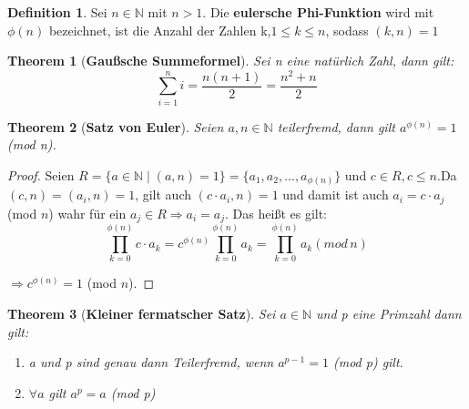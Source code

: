 \documentclass[12pt,oneside]{article}
\newtheorem{theorem}{Theorem}[section]
\theoremstyle{remark}
\theoremstyle{definition}
\newtheorem{definition}{Definition}[section]
\begin{document}
\smallskip

\begin{definition}\label{Df_6}
Sei $n \in \mathbb{N}$ mit $n > 1$. Die \textbf{eulersche Phi-Funktion} wird mit $\phi(n)$ bezeichnet, ist die Anzahl der Zahlen k,$1 \leq k \leq n$, sodass $(k,n) = 1$
\end{definition}

\smallskip

\begin{theorem}[\textbf{Gaußsche Summeformel}]\label{gauss}
Sei n eine natürlich Zahl, dann gilt:
\begin{equation}
    \sum_{i = 1}^{n} i = \frac{n (n + 1)}{2} = \frac{n^2 + n}{2} 
\end{equation}
\end{theorem}

\smallskip
\begin{theorem}[\textbf{Satz von Euler}]\label{Th_1}
Seien $a,n \in \mathbb{N}$ teilerfremd, \newline dann gilt $a^{\phi(n)} = 1 $(mod n).
\end{theorem}

\begin{proof}
    
Seien $R =\{ a \in \mathbb{N} \mid (a,n) = 1 \} =  \{a_{1}, a_{2},...,a_{\phi(n)} \}$ und $c \in R, c \leq n$.\newline\newline Da $(c,n) = (a_{i},n) = 1$, gilt auch $(c \cdot a_{i}, n) = 1$ \newline\newline und damit ist auch $a_{i} = c \cdot a_{j}$(mod $n$) wahr für ein $a_{j} \in R \Rightarrow a_{i} = a_{j}$. Das heißt es gilt:\newline
\begin{equation}
     \prod_{k = 0}^{\phi(n)} c \cdot a_{k} =
     c^{\phi(n)}\prod_{k = 0}^{\phi(n)} a_{k} = \prod_{k = 0}^{\phi(n)}  a_{k} (mod \, n )
\end{equation}
    
     $\Rightarrow c^{\phi(n)} = 1$ (mod $n$).

\end{proof}

\smallskip

\begin{theorem}[\textbf{Kleiner fermatscher Satz}]\label{Th_2}
Sei $a \in \mathbb{N}$ und p eine Primzahl dann gilt:\newline
\begin{enumerate}
    \item a und p sind genau dann Teilerfremd, wenn $a^{p-1} = 1 $ (mod p) gilt.
    \newline
    \item $\forall a $ gilt  $a^p = a$ (mod p)
\end{enumerate}
\end{theorem}
\end{document}
